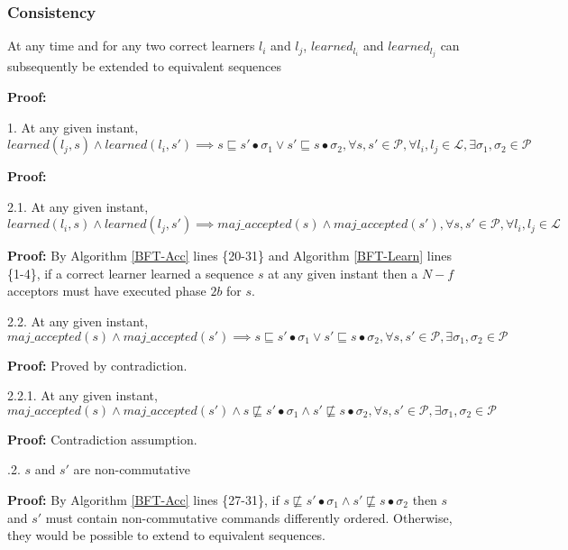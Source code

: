\subsubsection{Consistency}
\begin{theorem}At any time and for any two correct learners $l_i$ and $l_j$, $learned_{l_i}$ and $learned_{l_j}$ can subsequently be extended to equivalent sequences \par
\end{theorem} 
\textbf{Proof:} \par
\parbox{\linewidth}{1. At any given instant, $learned(l_j,s) \land learned(l_i,s') \implies s \sqsubseteq s' \bullet \sigma_1 \lor s' \sqsubseteq s \bullet \sigma_2, \forall s,s' \in \mathcal{P}, \forall l_i,l_j \in \mathcal{L}, \exists \sigma_1,\sigma_2 \in \mathcal{P}$}  \par
\indent\indent\textbf{Proof:} \par
\indent\indent\indent\parbox{\linewidth}{2.1. At any given instant, $learned(l_i,s) \land learned(l_j,s') \implies maj\_accepted(s) \land maj\_accepted(s'), \forall s,s' \in \mathcal{P}, \forall l_i,l_j \in \mathcal{L}$ } \par
\indent\indent\indent\indent\parbox{\linewidth}{\textbf{Proof:} By Algorithm \ref{BFT-Acc} lines \{20-31\} and Algorithm \ref{BFT-Learn} lines \{1-4\}, if a correct learner learned a sequence $s$ at any given instant then a $N-f$ acceptors must have executed phase $2b$ for $s$.}\par
\indent\indent\indent\parbox{\linewidth}{2.2. At any given instant, $maj\_accepted(s) \land maj\_accepted(s') \implies s \sqsubseteq s' \bullet \sigma_1 \lor s' \sqsubseteq s \bullet \sigma_2, \forall s,s' \in \mathcal{P}, \exists \sigma_1,\sigma_2 \in \mathcal{P}$}\par
\indent\indent\indent\indent\textbf{Proof:} Proved by contradiction.\par
\indent\indent\indent\indent\indent\parbox{\linewidth}{2.2.1. At any given instant, $maj\_accepted(s) \land maj\_accepted(s') \wedge s \not\sqsubseteq s' \bullet \sigma_1 \land s' \not\sqsubseteq s \bullet \sigma_2, \forall s,s' \in \mathcal{P}, \exists \sigma_1,\sigma_2 \in \mathcal{P}$} \par
\indent\indent\indent\indent\indent\indent\textbf{Proof:} Contradiction assumption.\par
\indent\indent\indent\indent{}.2. $s$ and $s'$ are non-commutative \par
\indent\indent\indent\indent\indent\indent \parbox{\linewidth}{\textbf{Proof:} By Algorithm \ref{BFT-Acc} lines \{27-31\}, if $s \not\sqsubseteq s' \bullet \sigma_1 \land s' \not\sqsubseteq s \bullet \sigma_2$ then $s$ and $s'$ must contain non-commutative commands differently ordered. Otherwise, they would be possible to extend to equivalent sequences.}\par
